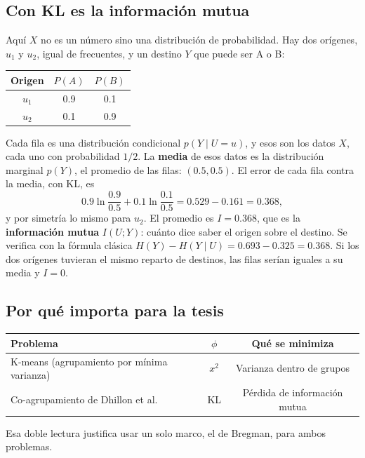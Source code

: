 \documentclass[11pt,a4paper]{article}
\begin{document}
\subsection{Con KL es la información mutua}

Aquí $X$ no es un número sino una distribución de probabilidad. Hay dos orígenes,
$u_1$ y $u_2$, igual de frecuentes, y un destino $Y$ que puede ser A o B:
\begin{center}
\begin{tabular}{ccc}
\toprule
Origen & $P(A)$ & $P(B)$ \\
\midrule
$u_1$ & 0.9 & 0.1 \\
$u_2$ & 0.1 & 0.9 \\
\bottomrule
\end{tabular}
\end{center}
Cada fila es una distribución condicional $p(Y\mid U=u)$, y esos son los datos $X$,
cada uno con probabilidad $1/2$. La \textbf{media} de esos datos es la
distribución marginal $p(Y)$, el promedio de las filas: $(0.5,0.5)$. El error de
cada fila contra la media, con KL, es
\[
  0.9\ln\frac{0.9}{0.5}+0.1\ln\frac{0.1}{0.5}=0.529-0.161=0.368,
\]
y por simetría lo mismo para $u_2$. El promedio es $I=0.368$, que es la
\textbf{información mutua} $I(U;Y)$: cuánto dice saber el origen sobre el destino.
Se verifica con la fórmula clásica $H(Y)-H(Y\mid U)=0.693-0.325=0.368$. Si los dos
orígenes tuvieran el mismo reparto de destinos, las filas serían iguales a su media
y $I=0$.

\subsection{Por qué importa para la tesis}

\begin{center}
\renewcommand{\arraystretch}{1.3}
\begin{tabular}{@{}>{\raggedright\arraybackslash}p{7.2cm}cc@{}}
\toprule
\textbf{Problema} & $\phi$ & \textbf{Qué se minimiza} \\
\midrule
K-means (agrupamiento por mínima varianza) & $x^2$ & Varianza dentro de grupos \\
\midrule
Co-agrupamiento de Dhillon et al. & KL & Pérdida de información mutua \\
\bottomrule
\end{tabular}
\end{center}
Esa doble lectura justifica usar un solo marco, el de Bregman, para ambos
problemas.
\end{document}
